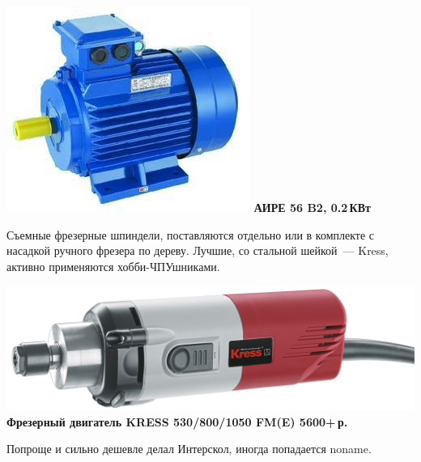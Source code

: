 \documentclass{magazine}
\begin{document}
{\noindent\includegraphics[width=\columnwidth]{fig/00/AIRE.jpg}
\textbf{АИРЕ 56 B2, 0.2\,КВт}


Съемные фрезерные шпиндели, поставляются отдельно или в комплекте с
насадкой ручного фрезера по дереву. Лучшие, со стальной шейкой\ --- Kress,
активно применяются хобби-ЧПУшниками. 

\noindent\href{http://kress-shop.ru/product/frezernyj-dvigatel-530-fm-kress-06082302/}{
\includegraphics[width=\columnwidth]{fig/00/Kress530.jpg}}
\textbf{Фрезерный двигатель KRESS 530/800/1050 FM(E) 5600+\,р.}

Попроще и сильно дешевле делал Интерскол, иногда попадается noname.

}
\end{document}

